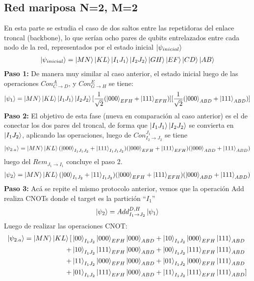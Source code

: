 \subsection{Red mariposa N=2, M=2}
En esta parte se estudia el caso de dos saltos entre las repetidoras del enlace troncal (backbone), lo que serían ocho pares de qubits entrelazados entre cada nodo de la red, representados por el estado inicial $\ket{\psi_{inicial}}$
\begin{align*}
\ket{\psi_{inicial}} = \ket{MN}\ket{KL}\ket{I_1 J_1}\ket{I_2 J_2}\ket{GH}\ket{EF}\ket{CD}\ket{AB}
\end{align*}
\textbf{Paso 1:} De manera muy similar al caso anterior, el estado inicial luego de las operaciones $Con^{A}_{C \rightarrow D}$, y $Con^{E}_{G \rightarrow H}$ se tiene:
\begin{align*}
  \ket{\psi_{1}} = \ket{MN} \ket{KL} \ket{I_1 J_1}\ket{I_2 J_2}
[\frac{1}{\sqrt{2}} (\ket{000}_{EFH} + \ket{111}_{EFH})] 
[\frac{1}{\sqrt{2}} (\ket{000}_{ABD} + \ket{111}_{ABD})] 
\end{align*} 
\textbf{Paso 2:} El objetivo de esta fase (nueva en comparación al caso anterior) es el de conectar los dos pares del troncal, de forma que $\ket{I_1 J_1}\ket{I_2 J_2}$ se convierta en $\ket{I_1 J_2}$, aplicando las operaciones, luego de $Con^{J_1}_{I_2 \rightarrow J_2}$ se tiene
\begin{align*}
\ket{\psi_{2.a}} = \ket{MN} \ket{KL} (\ket{000}_{I_1 J_1 J_2}+\ket{111}_{I_1 J_1 J_2}) (\ket{000}_{EFH} + \ket{111}_{EFH}) (\ket{000}_{ABD} + \ket{111}_{ABD})
\end{align*}
luego del $Rem_{J_1 \rightarrow I_1}$ concluye el paso 2.
\begin{align*}
\ket{\psi_{2}} =  \ket{MN} \ket{KL} (\ket{00}_{I_1 J_2}+\ket{11}_{I_1 J_2}) (\ket{000}_{EFH} + \ket{111}_{EFH}) (\ket{000}_{ABD} + \ket{111}_{ABD})
\end{align*}
\textbf{Paso 3:} Acá se repite el mismo protocolo anterior, vemos que la operación Add realiza CNOTs donde el target es la partición ``$I_1$''
\begin{align*}
\ket{\psi_{2}} = Add^{D,H}_{I_1 \rightarrow J_2} \ket{\psi_1} 
\end{align*}
Luego de realizar las operaciones CNOT:
\begin{align*}
\ket{\psi_{2.a}} =  \ket{MN}\ket{KL}
[ & \ket{00}_{I_1 J_2} \ket{000}_{EFH} \ket{000}_{ABD} + \ket{10}_{I_1 J_2} \ket{000}_{EFH} \ket{111}_{ABD} \\
+ & \ket{10}_{I_1 J_2} \ket{111}_{EFH} \ket{000}_{ABD} + \ket{00}_{I_1 J_2} \ket{111}_{EFH} \ket{111}_{ABD} \\
+ & \ket{11}_{I_1 J_2} \ket{000}_{EFH} \ket{000}_{ABD} + \ket{01}_{I_1 J_2} \ket{000}_{EFH} \ket{111}_{ABD} \\
+ & \ket{01}_{I_1 J_2} \ket{111}_{EFH} \ket{000}_{ABD} + \ket{11}_{I_1 J_2} \ket{111}_{EFH} \ket{111}_{ABD} ]
\end{align*}

